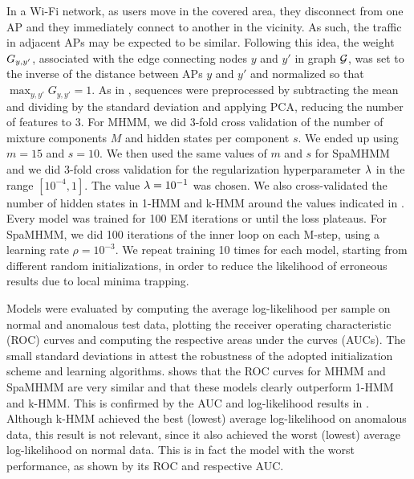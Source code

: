 In a Wi-Fi network, as users move in the covered area, they disconnect from one AP and they immediately connect to another in the vicinity. As such, the traffic in adjacent APs may be expected to be similar. Following this idea, the weight ${G}_{y,y'}$, associated with the edge connecting nodes $y$ and $y'$ in graph ${\mathcal{G}}$, was set to the inverse of the distance between APs $y$ and $y'$ and normalized so that $\max_{y,y'} G_{y,y'}=1$. As in \citet{Anisa2017}, sequences were preprocessed by subtracting the mean and dividing by the standard deviation and applying PCA, reducing the number of features to 3. For MHMM, we did 3-fold cross validation of the number of mixture components $M$ and hidden states per component $s$. We ended up using $m=15$ and $s=10$. We then used the same values of $m$ and $s$ for SpaMHMM and we did 3-fold cross validation for the regularization hyperparameter $\lambda$ in the range $[10^{-4}, 1]$. The value $\lambda=10^{-1}$ was chosen. We also cross-validated the number of hidden states in 1-HMM and k-HMM around the values indicated in . Every model was trained for 100 EM iterations or until the loss plateaus. For SpaMHMM, we did 100 iterations of the inner loop on each M-step, using a learning rate $\rho=10^{-3}$. We repeat training 10 times for each model, starting from different random initializations, in order to reduce the likelihood of erroneous results due to local minima trapping.

Models were evaluated by computing the average log-likelihood per sample on normal and anomalous test data, plotting the receiver operating characteristic (ROC) curves and computing the respective areas under the curves (AUCs). The small standard deviations in  attest the robustness of the adopted initialization scheme and learning algorithms.  shows that the ROC curves for MHMM and SpaMHMM are very similar and that these models clearly outperform 1-HMM and k-HMM. This is confirmed by the AUC and log-likelihood results in . Although k-HMM achieved the best (lowest) average log-likelihood on anomalous data, this result is not relevant, since it also achieved the worst (lowest) average log-likelihood on normal data. This is in fact the model with the worst performance, as shown by its ROC and respective AUC.

